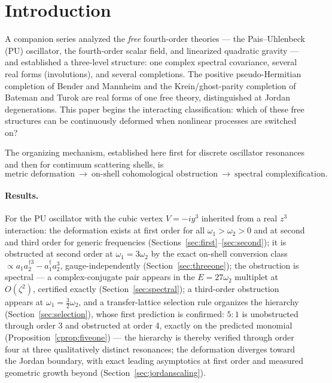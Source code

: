 \documentclass[11pt]{article}
\theoremstyle{definition}
\theoremstyle{remark}
\newcommand{\w}{\omega}
\newcommand{\dg}{\dagger}
\begin{document}
\tableofcontents

\section{Introduction}\label{sec:intro}

A companion series \cite{paperI,paperII,paperIII,paperIV} analyzed the
\emph{free} fourth-order theories --- the Pais--Uhlenbeck (PU)
oscillator, the fourth-order scalar field, and linearized quadratic
gravity --- and established a three-level structure: one complex
spectral covariance, several real forms (involutions), and several
completions.  The positive pseudo-Hermitian completion of Bender and
Mannheim \cite{BM2008PRL,BM2008PRD} and the Krein/ghost-parity
completion of Bateman and Turok \cite{BT2026} are real forms of one
free theory, distinguished at Jordan degenerations.  This paper begins
the interacting classification: which of these free structures can be
continuously deformed when nonlinear processes are switched on?

The organizing mechanism, established here first for discrete
oscillator resonances and then for continuum scattering shells, is
\begin{equation*}
\text{metric deformation}
\ \longrightarrow\
\text{on-shell cohomological obstruction}
\ \longrightarrow\
\text{spectral complexification}.
\end{equation*}

\paragraph{Results.}
For the PU oscillator with the cubic vertex $V=-iy^3$ inherited from a
real $z^3$ interaction: the deformation exists at first order for all
$\w_1>\w_2>0$ and at second and third order for generic frequencies
(Sections~\ref{sec:first}--\ref{sec:second}); it is obstructed at
second order at $\w_1=3\w_2$ by the exact on-shell conversion class
$\propto a_1a_2^{\dg3}-a_1^{\dg}a_2^3$, gauge-independently
(Section~\ref{sec:threeone}); the obstruction is spectral --- a
complex-conjugate pair appears in the $E=27\w_2$ multiplet at
$O(\zeta^2)$, certified exactly (Section~\ref{sec:spectral}); a
third-order obstruction appears at $\w_1=\tfrac32\w_2$, and a
transfer-lattice selection rule organizes the hierarchy
(Section~\ref{sec:selection}), whose first prediction is confirmed:
$5{:}1$ is unobstructed through order 3 and obstructed at order 4,
exactly on the predicted monomial
(Proposition~\ref{cprop:fiveone}) --- the hierarchy is thereby
verified through order four at three qualitatively distinct
resonances; the deformation diverges toward the
Jordan boundary, with exact leading asymptotics at first order and
measured geometric growth beyond (Section~\ref{sec:jordanscaling}).
\end{document}
